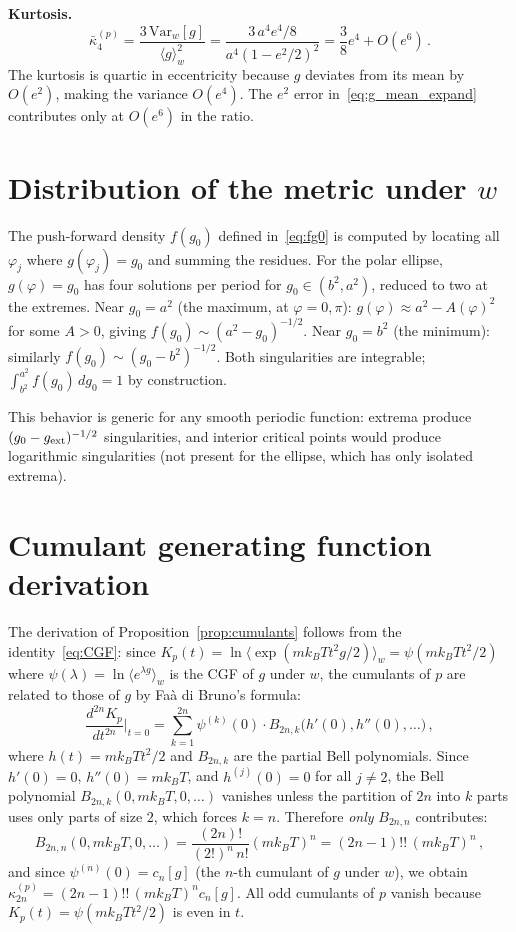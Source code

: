 \documentclass[aps,pre,twocolumn,superscriptaddress,longbibliography,floatfix]{revtex4-2}
\begin{document}
\textbf{Kurtosis.}
\begin{equation}
  \bar\kappa_4^{(p)} = \frac{3\,\mathrm{Var}_w[g]}{\langle g\rangle_w^2}
  = \frac{3\,a^4 e^4/8}{a^4(1-e^2/2)^2}
  = \frac{3}{8}e^4 + O(e^6)\,.
  \label{eq:kappa4_small_e}
\end{equation}
The kurtosis is quartic in eccentricity because $g$ deviates from its mean by $O(e^2)$,
making the variance $O(e^4)$.
The $e^2$ error in~\eqref{eq:g_mean_expand} contributes only at $O(e^6)$ in the ratio.

\section{Distribution of the metric under $w$}
\label{app:dist_g}

The push-forward density $f(g_0)$ defined in~\eqref{eq:fg0} is computed by locating all
$\varphi_j$ where $g(\varphi_j)=g_0$ and summing the residues.
For the polar ellipse, $g(\varphi)=g_0$ has four solutions per period for
$g_0\in(b^2,a^2)$, reduced to two at the extremes.
Near $g_0=a^2$ (the maximum, at $\varphi=0,\pi$): $g(\varphi)\approx a^2-A(\varphi)^2$
for some $A>0$, giving $f(g_0)\sim(a^2-g_0)^{-1/2}$.
Near $g_0=b^2$ (the minimum): similarly $f(g_0)\sim(g_0-b^2)^{-1/2}$.
Both singularities are integrable; $\int_{b^2}^{a^2}f(g_0)\,dg_0=1$ by construction.

This behavior is generic for any smooth periodic function: extrema produce
$(g_0-g_{\rm ext})^{-1/2}$ singularities, and interior critical points would produce
logarithmic singularities (not present for the ellipse, which has only isolated extrema).

\section{Cumulant generating function derivation}
\label{app:kurtosis}

The derivation of Proposition~\ref{prop:cumulants} follows from the
identity~\eqref{eq:CGF}: since
$K_p(t) = \ln\langle \exp(mk_BT t^2 g/2)\rangle_w = \psi(mk_BT t^2/2)$
where $\psi(\lambda)=\ln\langle e^{\lambda g}\rangle_w$ is the CGF of $g$ under $w$,
the cumulants of $p$ are related to those of $g$ by Fa\`a di Bruno's formula:
\begin{equation}
  \frac{d^{2n}K_p}{dt^{2n}}\bigg|_{t=0}
  = \sum_{k=1}^{2n} \psi^{(k)}(0)\cdot B_{2n,k}\!\bigl(h'(0),h''(0),\ldots\bigr)\,,
\end{equation}
where $h(t)=mk_BT t^2/2$ and $B_{2n,k}$ are the partial Bell polynomials.
Since $h'(0)=0$, $h''(0)=mk_BT$, and $h^{(j)}(0)=0$ for all $j\neq 2$,
the Bell polynomial $B_{2n,k}(0,mk_BT,0,\ldots)$ vanishes unless the partition
of $2n$ into $k$ parts uses only parts of size $2$, which forces $k=n$.
Therefore \emph{only} $B_{2n,n}$ contributes:
\begin{equation}
  B_{2n,n}(0,mk_BT,0,\ldots)
  = \frac{(2n)!}{(2!)^n\,n!}(mk_BT)^n = (2n-1)!!\,(mk_BT)^n\,,
\end{equation}
and since $\psi^{(n)}(0)=c_n[g]$ (the $n$-th cumulant of $g$ under $w$), we obtain
$\kappa_{2n}^{(p)}=(2n-1)!!\,(mk_BT)^n c_n[g]$.
All odd cumulants of $p$ vanish because $K_p(t)=\psi(mk_BT t^2/2)$ is even in $t$.
\end{document}
